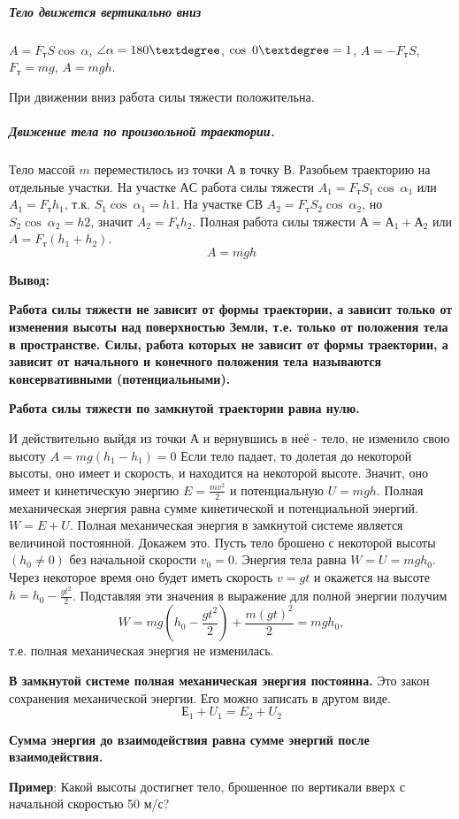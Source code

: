 \documentclass[a5paper, 10pt]{diss_4}
\renewcommand{\'}{\,'}
\begin{document}
\subparagraph*{Тело движется вертикально вниз} $A=F_тS\cos\ \alpha$, $\angle\alpha=180\textdegree$,  $\cos\ 0\textdegree = 1$, $A= -F_тS$,$ F_т=mg$,  $A=mgh$.

При движении вниз работа силы тяжести положительна.

\subparagraph*{Движение тела по произвольной траектории.} Тело массой $m$ переместилось из точки $А$ в точку $В$. Разобьем траекторию на отдельные участки. На участке $АС$ работа силы тяжести $A_1=F_тS_1\cos\ \alpha_1$  или $ A_1=F_тh_1$, т.к. $S_1\cos\ \alpha_1=h1$. На участке $СВ$ $A_2=F_тS_2\cos\ \alpha_2$, но $S_2\cos\ \alpha_2=h2$, значит $A_2=F_тh_2$. Полная  работа силы тяжести $А=А_1+А_2$ или $A=F_т(h_1+h_2)$.
\[
A=mgh
\]

\textbf{Вывод:}

\textbf{Работа силы тяжести не зависит от формы траектории, а зависит только от изменения  высоты над поверхностью Земли, т.е. только от положения тела в пространстве. Силы, работа которых не зависит от формы траектории, а зависит от начального и конечного положения тела называются консервативными (потенциальными).}

\textbf{Работа силы тяжести по замкнутой траектории  равна нулю.}

И действительно выйдя из точки $А$ и вернувшись в неё - тело, не изменило свою высоту  $A=mg(h_1-h_1)=0$
Если тело падает, то долетая до некоторой высоты, оно имеет и скорость, и находится на некоторой высоте. Значит, оно имеет и кинетическую энергию $E=\frac{mv^2}{2}$ и потенциальную $U=mgh$. Полная механическая энергия равна сумме кинетической и потенциальной энергий. $W = E+U$. Полная механическая энергия в замкнутой системе является величиной постоянной. Докажем это. Пусть тело брошено с некоторой высоты $(h_0\ne 0)$  без начальной скорости $v_0= 0$. Энергия тела равна $W = U = mgh_0$. Через некоторое время оно будет иметь скорость $v = gt$ и окажется на высоте $h=h_0-\frac{gt^2}{2}$.  Подставляя эти значения в выражение для полной энергии получим
\[
W=mg(h_0-\frac{gt^2}{2})+\frac{m(gt)^2}{2}=mgh_0,
\]
т.е. полная механическая энергия не изменилась.

\textbf{В замкнутой системе полная механическая энергия постоянна.} Это закон сохранения механической энергии. Его можно записать в другом виде.
\[
Е_1 + U_1 = E_2 + U_2
\]

\textbf{Сумма энергия до взаимодействия равна сумме энергий после взаимодействия.}

\textbf{Пример}: Какой высоты достигнет тело, брошенное по вертикали вверх с начальной скоростью 50 м/с?
\end{document}
